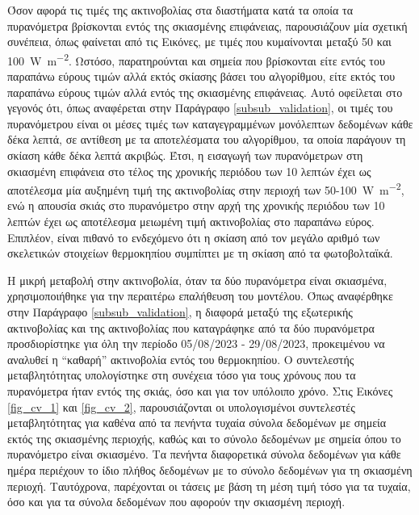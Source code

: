 \documentclass[12pt, a4paper]{report} %
\begin{document}
Όσον αφορά τις τιμές της ακτινοβολίας στα διαστήματα κατά τα οποία τα πυρανόμετρα βρίσκονται εντός της σκιασμένης 
επιφάνειας, παρουσιάζουν μία σχετική συνέπεια, όπως φαίνεται από τις Εικόνες, με τιμές που κυμαίνονται μεταξύ 50 και 
\SI{100}{\watt\per\meter\squared}. Ωστόσο, παρατηρούνται και σημεία που βρίσκονται είτε εντός του παραπάνω εύρους τιμών 
αλλά εκτός σκίασης βάσει του αλγορίθμου, είτε εκτός του παραπάνω εύρους τιμών αλλά εντός της σκιασμένης επιφάνειας. 
Αυτό οφείλεται στο γεγονός ότι, όπως αναφέρεται στην Παράγραφο \ref{subsub_validation}, οι τιμές του πυρανόμετρου είναι 
οι μέσες τιμές των καταγεγραμμένων μονόλεπτων δεδομένων κάθε δέκα λεπτά, σε αντίθεση με τα αποτελέσματα του αλγορίθμου, 
τα οποία παράγουν τη σκίαση κάθε δέκα λεπτά ακριβώς. Έτσι, η εισαγωγή των πυρανόμετρων στη σκιασμένη επιφάνεια στο τέλος 
της χρονικής περιόδου των 10 λεπτών έχει ως αποτέλεσμα μία αυξημένη τιμή της ακτινοβολίας στην περιοχή των 
50-\SI{100}{\watt\per\meter\squared}, ενώ η απουσία σκιάς στο πυρανόμετρο στην αρχή της χρονικής περιόδου των 10 λεπτών 
έχει ως αποτέλεσμα μειωμένη τιμή ακτινοβολίας στο παραπάνω εύρος. Επιπλέον, είναι πιθανό το ενδεχόμενο ότι η σκίαση από 
τον μεγάλο αριθμό των σκελετικών στοιχείων θερμοκηπίου συμπίπτει με τη σκίαση από τα φωτοβολταϊκά.

Η μικρή μεταβολή στην ακτινοβολία, όταν τα δύο πυρανόμετρα είναι σκιασμένα, χρησιμοποιήθηκε για την περαιτέρω επαλήθευση 
του μοντέλου. Όπως αναφέρθηκε στην Παράγραφο \ref{subsub_validation}, η διαφορά μεταξύ της εξωτερικής ακτινοβολίας και 
της ακτινοβολίας που καταγράφηκε από τα δύο πυρανόμετρα προσδιορίστηκε για όλη την περίοδο 05/08/2023 - 29/08/2023, 
προκειμένου να αναλυθεί η “καθαρή” ακτινοβολία εντός του θερμοκηπίου. Ο συντελεστής μεταβλητότητας υπολογίστηκε στη 
συνέχεια τόσο για τους χρόνους που τα πυρανόμετρα ήταν εντός της σκιάς, όσο και για τον υπόλοιπο χρόνο. Στις Εικόνες 
\ref{fig_cv_1} και \ref{fig_cv_2}, παρουσιάζονται οι υπολογισμένοι συντελεστές μεταβλητότητας για καθένα από τα πενήντα 
τυχαία σύνολα δεδομένων με σημεία εκτός της σκιασμένης περιοχής, καθώς και το σύνολο δεδομένων με σημεία όπου το 
πυρανόμετρο είναι σκιασμένο. Τα πενήντα διαφορετικά σύνολα δεδομένων για κάθε ημέρα περιέχουν το ίδιο πλήθος δεδομένων 
με το σύνολο δεδομένων για τη σκιασμένη περιοχή. Ταυτόχρονα, παρέχονται οι τάσεις με βάση τη μέση τιμή τόσο για τα τυχαία, 
όσο και για τα σύνολα δεδομένων που αφορούν την σκιασμένη περιοχή.
\end{document}
